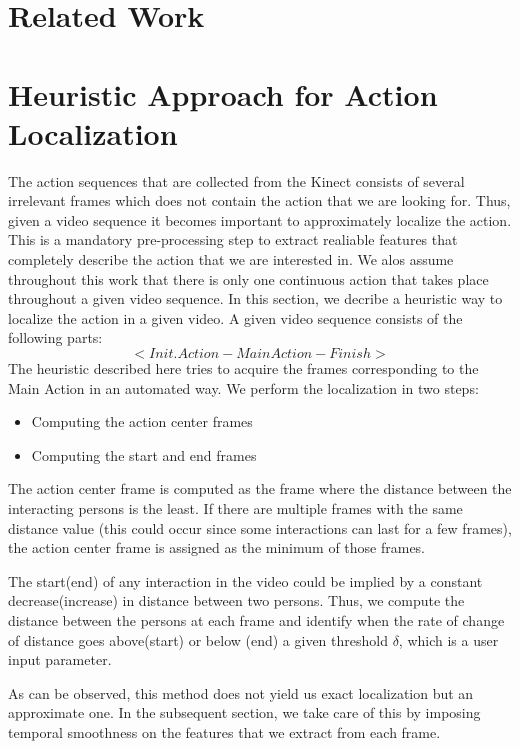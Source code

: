 \documentclass[10pt,twocolumn,letterpaper]{article}
\begin{document}
\section{Related Work}

\section{Heuristic Approach for Action Localization}\label{sec:actionlocalization}
The action sequences that are collected from the Kinect consists of several irrelevant frames which does not contain the action that we are looking for. Thus, given a video sequence it becomes important to approximately localize the action. This is a mandatory pre-processing step to extract realiable features that completely describe the action that  we are interested in. We alos assume throughout this work that there is only one continuous action that takes place throughout a given video sequence. In this section, we decribe a heuristic way to localize the action in a given video. A given video sequence consists of the following parts:
\begin{equation}
<Init. Action - Main Action - Finish>
\end{equation}
The heuristic described here tries to acquire the frames corresponding to the Main Action  in an automated way. We perform the localization in two steps:
\begin{itemize}
\item Computing the action center frames
\item Computing the start and end frames
\end{itemize}

The action center frame is computed as the frame where the distance between the interacting persons is the least. If there are multiple frames with the same distance value (this could occur since some interactions can last for a few frames), the action center frame is assigned as the minimum of those frames.

The start(end) of any interaction in the video could be implied by a constant decrease(increase) in distance between two persons. Thus, we compute the distance between the persons at each frame and identify when the rate of change of distance goes above(start) or below (end) a given threshold $\delta$, which is a user input parameter. 


As can be observed, this method does not yield us exact localization but an approximate one. In the subsequent section, we take care of this by imposing temporal smoothness on the features that we extract from each frame. 
\end{document}
